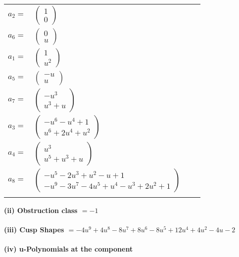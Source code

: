 \documentclass[1p]{elsarticle_modified}
\theoremstyle{definition}
\begin{document}
\begin{tabular}{m{7pt} m{180pt} m{7pt} m{180pt} }
\flushright $a_{2}=$&$\begin{pmatrix}1\\0\end{pmatrix}$ \\
\flushright $a_{6}=$&$\begin{pmatrix}0\\u\end{pmatrix}$ \\
\flushright $a_{1}=$&$\begin{pmatrix}1\\u^2\end{pmatrix}$ \\
\flushright $a_{5}=$&$\begin{pmatrix}- u\\u\end{pmatrix}$ \\
\flushright $a_{7}=$&$\begin{pmatrix}- u^3\\u^3+u\end{pmatrix}$ \\
\flushright $a_{3}=$&$\begin{pmatrix}- u^6- u^4+1\\u^6+2 u^4+u^2\end{pmatrix}$ \\
\flushright $a_{4}=$&$\begin{pmatrix}u^3\\u^5+u^3+u\end{pmatrix}$ \\
\flushright $a_{8}=$&$\begin{pmatrix}- u^5-2 u^3+u^2- u+1\\- u^9-3 u^7-4 u^5+u^4- u^3+2 u^2+1\end{pmatrix}$\\&\end{tabular}
\flushleft \textbf{(ii) Obstruction class $= -1$}\\~\\
\flushleft \textbf{(iii) Cusp Shapes $= -4 u^9+4 u^8-8 u^7+8 u^6-8 u^5+12 u^4+4 u^2-4 u-2$}\\~\\
\newpage\renewcommand{\arraystretch}{1}
\flushleft \textbf{(iv) u-Polynomials at the component}\newline \\
\end{document}
